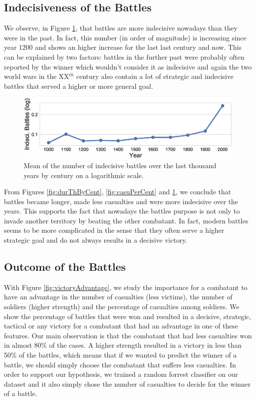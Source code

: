 \subsection{Indecisiveness of the Battles}

We observe, in Figure \ref{fig:IndecBattles}, that battles are more indecisive nowadays than they were in the past. In fact, this number (in order of magnitude) is increasing since year 1200 and shows an higher increase for the last last century and now. This can be explained by two factors: battles in the further past were probably often reported by the winner which wouldn't consider it as indecisive and again the two world wars in the  XX$^{th}$ century also contain a lot of strategic and indecisive battles that served a higher or more general goal.
 \begin{figure}[h]
	\centering	\includegraphics[width=\linewidth]{figures/indThByCent}
	\caption{Mean of the number of indecisive battles over the last thousand years by century on a logarithmic scale.}\label{fig:IndecBattles}
	\centering
\end{figure}

From Figures \ref{fig:durThByCent}, \ref{fig:casuPerCent} and \ref{fig:IndecBattles}, we conclude that battles became longer, made less casualties and were more indecisive over the years. This supports the fact that nowadays the battles purpose is not only to invade another territory by beating the other combatant. In fact, modern battles seems to be more complicated in the sense that they often serve a higher strategic goal and do not always results in a decisive victory.

\subsection{Outcome of the Battles}

With Figure \ref{fig:victoryAdvantage}, we study the importance for a combatant to have an advantage in the number of casualties (less victims), the number of soldiers (higher strength) and the percentage of casualties among soldiers. We show the percentage of battles that were won and resulted in a decisive, strategic, tactical or any victory for a combatant that had an advantage in one of these features. Our main observation is that the combatant that had less casualties won in almost 80\% of the cases. A higher strength resulted in a victory in less than 50\% of the battles, which means that if we wanted to predict the winner of a battle, we should simply choose the combatant that suffers less casualties. In order to support our hypothesis, we trained a random forrest classifier on our dataset and it also simply chose the number of casualties to decide for the winner of a battle.

